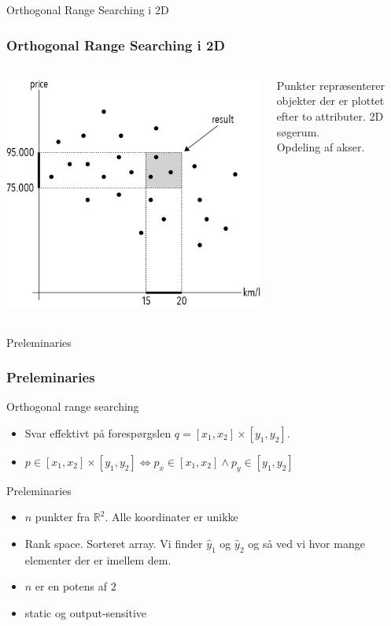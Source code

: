 \documentclass[pdf]{beamer}
\begin{document}
\begin{frame}{Orthogonal Range Searching i 2D}
  \frametitle{Orthogonal Range Searching i 2D}
  \begin{columns}
    \begin{center}
      \includegraphics[scale=0.8]{pictures/introduction.png}
    \end{center}
    Punkter repræsenterer objekter der er plottet efter to attributer. 2D søgerum.\\

    Opdeling af akser.


  \end{columns}

\end{frame}

\begin{frame}{Preleminaries}
  \frametitle{Preleminaries}
  Orthogonal range searching
  \begin{itemize}
    \item Svar effektivt på forespørgslen $q = [x_1, x_2] \times [y_1, y_2]$.
    \item $p \in [x_1, x_2] \times [y_1, y_2] \Leftrightarrow p_x \in [x_1, x_2] \wedge p_y \in [y_1, y_2]$
  \end{itemize}

  Preleminaries
  \begin{itemize}

    \item $n$ punkter fra $\mathbb{R}^2$. Alle koordinater er unikke
    \item Rank space. Sorteret array. Vi finder $\hat{y}_1$ og $\hat{y}_2$ og så ved vi hvor mange elementer der er imellem dem.
    \item $n$ er en potens af $2$
    \item static og output-sensitive
  \end{itemize}
\end{frame}
\end{document}
